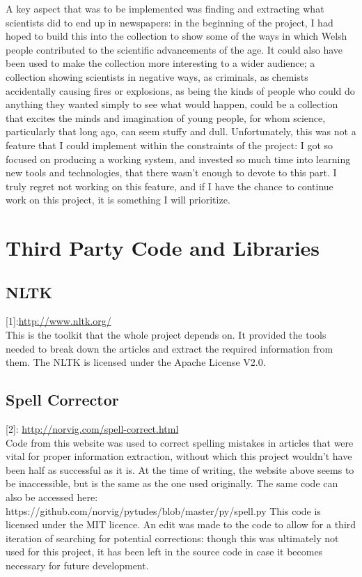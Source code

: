 \documentclass[11pt,a4paper]{book}
\begin{document}
A key aspect that was to be implemented was finding and extracting what scientists did to end up in newspapers: in the beginning of the project, I had hoped to build this into the collection to show some of the ways in which Welsh people contributed to the scientific advancements of the age. It could also have been used to make the collection more interesting to a wider audience; a collection showing scientists in negative ways, as criminals, as chemists accidentally causing fires or explosions, as being the kinds of people who could do anything they wanted simply to see what would happen, could be a collection that excites the minds and imagination of young people, for whom science, particularly that long ago, can seem stuffy and dull. Unfortunately, this was not a feature that I could implement within the constraints of the project: I got so focused on producing a working system, and invested so much time into learning new tools and technologies, that there wasn't enough to devote to this part. I truly regret not working on this feature, and if I have the chance to continue work on this project, it is something I will prioritize. 




\appendix
\chapter{Third Party Code and Libraries}

\section{NLTK}
\label{appendix:nltk}
\color{blue}[1]\color{black}:\url{http://www.nltk.org/}\\
This is the toolkit that the whole project depends on. It provided the tools needed to break down the articles and extract the required information from them. The NLTK is licensed under the Apache License V2.0.

\section{Spell Corrector}
\label{appendix:norvig}
\color{blue}[2]\color{black}: \url{http://norvig.com/spell-correct.html}\\
Code from this website was used to correct spelling mistakes in articles that were vital for proper information extraction, without which this project wouldn't have been half as successful as it is. At the time of writing, the website above seems to be inaccessible, but is the same as the one used originally. The same code can also be accessed here: https://github.com/norvig/pytudes/blob/master/py/spell.py
This code is licensed under the MIT licence. An edit was made to the code to allow for a third iteration of searching for potential corrections: though this was ultimately not used for this project, it has been left in the source code in case it becomes necessary for future development.
\end{document}
